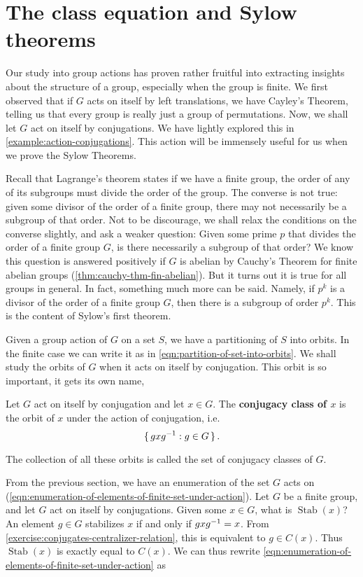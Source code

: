 \documentclass[./main.tex]{subfiles}
\begin{document}
\section{The class equation and Sylow theorems}
Our study into group actions has proven rather fruitful into extracting insights
about the structure of a group, especially when the group is finite. We first
observed that if $G$ acts on itself by left translations, we have Cayley's
Theorem, telling us that every group is really just a group of permutations.
Now, we shall let $G$ act on itself by conjugations. We have lightly explored
this in \cref{example:action-conjugations}. This action will be immensely useful
for us when we prove the Sylow Theorems. 

Recall that Lagrange's theorem states if we have a finite group, the order of
any of its subgroups must divide the order of the group. The converse is not
true: given some divisor of the order of a finite group, there may not
necessarily be a subgroup of that order. Not to be discourage, we shall relax
the conditions on the converse slightly, and ask a weaker question: Given some
prime $p$ that divides the order of a finite group $G$, is there necessarily a
subgroup of that order? We know this question is answered positively if $G$ is
abelian by Cauchy's Theorem for finite abelian groups
(\cref{thm:cauchy-thm-fin-abelian}). But it turns out it is true for all groups
in general. In fact, something much more can be said. Namely, if $p^k$ is a
divisor of the order of a finite group $G$, then there is a subgroup of order
$p^k$. This is the content of Sylow's first theorem.

Given a group action of $G$ on a set $S$, we have a partitioning of $S$ into
orbits. In the finite case we can write it as in
\cref{eqn:partition-of-set-into-orbits}. We shall study the orbits of $G$ when
it acts on itself by conjugation. This orbit is so important, it gets its own name,
\begin{definition}
\label{def:conjugacy-class}
    Let $G$ act on itself by conjugation and let $x \in G$. The
    \textbf{conjugacy class of $x$} is the orbit of $x$ under the action of
    conjugation, i.e. 
    \[
        \set{gxg^{-1}: g \in G}.
    \]
\end{definition}
The collection of all these orbits is called the set of conjugacy classes of
$G$.

From the previous section, we have an enumeration of the set $G$ acts on
(\cref{eqn:enumeration-of-elements-of-finite-set-under-action}). Let $G$ be a
finite group, and let $G$ act on itself by conjugations. Given some $x \in G$,
what is $\operatorname{Stab}(x)$? An element $g \in G$ stabilizes $x$ if and
only if $gxg^{-1} = x$. From \cref{exercise:conjugates-centralizer-relation},
this is equivalent to $g \in C(x)$. Thus $\operatorname{Stab}(x)$ is exactly
equal to $C(x)$. We can thus rewrite
\cref{eqn:enumeration-of-elements-of-finite-set-under-action} as 
\end{document}
